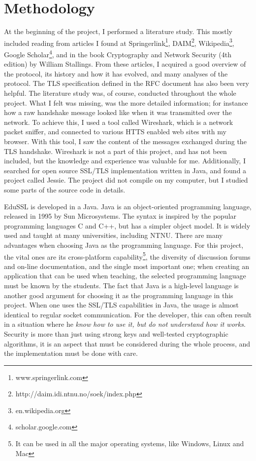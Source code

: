 \documentclass[12pt,a4paper,titlepage]{report}
\begin{document}
\section{Methodology}
\label{sec:methodology}
At the beginning of the project, I performed a literature study. This mostly included reading from articles I found at Springerlink\footnote{www.springerlink.com}, DAIM\footnote{http://daim.idi.ntnu.no/soek/index.php}, Wikipedia\footnote{en.wikipedia.org}, Google Scholar\footnote{scholar.google.com}, and in the book Cryptography and Network Security (4th edition) by William Stallings. From these articles, I acquired a good overview of the protocol, its history and how it has evolved, and many analyses of the protocol. The TLS specification defined in the RFC document has also been very helpful. The literature study was, of course, conducted throughout the whole project. What I felt was missing, was the more detailed information; for instance how a raw handshake message looked like when it was transmitted over the network. To achieve this, I used a tool called Wireshark, which is a network packet sniffer, and connected to various HTTS enabled web sites with my browser. With this tool, I saw the content of the messages exchanged during the TLS handshake. Wireshark is not a part of this project, and has not been included, but the knowledge and experience was valuable for me. Additionally, I searched for open source SSL/TLS implementation written in Java, and found a project called Jessie\cite{jessie}. The project did not compile on my computer, but I studied some parts of the source code in details.

EduSSL is developed in a Java. Java is an object-oriented programming language, released in 1995 by Sun Microsystems. The syntax is inspired by the popular programming languages C and C++, but has a simpler object model. It is widely used and taught at many universities, including NTNU. There are many advantages when choosing Java as the programming language. For this project, the vital ones are its cross-platform capability\footnote{It can be used in all the major operating systems, like Windows, Linux and Mac}, the diversity of discussion forums and on-line documentation, and the single most important one; when creating an application that can be used when teaching, the selected programming language must be known by the students. The fact that Java is a high-level language is another good argument for choosing it as the programming language in this project. When one uses the SSL/TLS capabilities in Java, the usage is almost identical to regular socket communication. For the developer, this can often result in a situation where he \emph{know how to use it, but do not understand how it works}. Security is more than just using strong keys and well-tested cryptographic algorithms, it is an aspect that must be considered during the whole process, and the implementation must be done with care. \cite{gosling}
\end{document}
